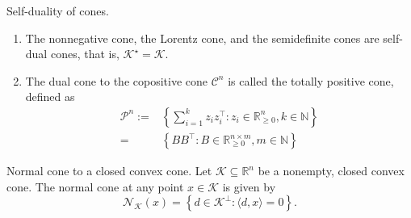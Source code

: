 \begin{theorem}[L9.2]{Self-duality of cones.}
\begin{enumerate}[leftmargin=*]
    \item The nonnegative cone, the Lorentz cone, and the semidefinite cones are self-dual cones, that is, $\mathcal{K}^{\star}=\mathcal{K}$.
    \item The dual cone to the copositive cone $\mathcal{C}^n$ is called the totally positive cone, defined as
    \vspace{-4pt}\\
    $$
    \begin{aligned}
        \mathcal{P}^n:=&\left\{\sum_{i=1}^k z_i z_i^{\top}: z_i \in \mathbb{R}_{\geq 0}^n, k \in \mathbb{N}\right\}\\
        =&\left\{B B^{\top}: B \in \mathbb{R}_{\geq 0}^{n \times m}, m \in \mathbb{N}\right\}
    \end{aligned}
    $$
    \vspace{-4pt}
\end{enumerate}
\end{theorem}

\begin{theorem}[L9.3]{Normal cone to a closed convex cone.}
    Let $\mathcal{K} \subseteq \mathbb{R}^n$ be a nonempty, closed convex cone. The normal cone at any point $x \in \mathcal{K}$ is given by
    \vspace{-4pt}\\
    $$
    \mathcal{N}_{\mathcal{K}}(x)=\left\{d \in \mathcal{K}^{\perp}:\langle d, x\rangle=0\right\} .
    $$
    \vspace{-4pt}
\end{theorem}



